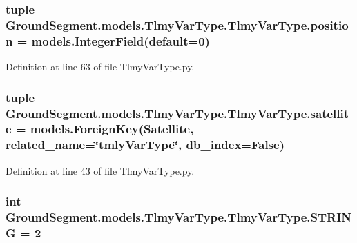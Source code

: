 \subsubsection[{position}]{\setlength{\rightskip}{0pt plus 5cm}tuple Ground\+Segment.\+models.\+Tlmy\+Var\+Type.\+Tlmy\+Var\+Type.\+position = models.\+Integer\+Field(default=0)\hspace{0.3cm}{\ttfamily [static]}}\label{class_ground_segment_1_1models_1_1_tlmy_var_type_1_1_tlmy_var_type_aa3a596ef393485c1f9574fbafc151967}


Definition at line 63 of file Tlmy\+Var\+Type.\+py.

\hypertarget{class_ground_segment_1_1models_1_1_tlmy_var_type_1_1_tlmy_var_type_a19f48547f2aaf1df7c8271723fad516e}{}
\subsubsection[{satellite}]{\setlength{\rightskip}{0pt plus 5cm}tuple Ground\+Segment.\+models.\+Tlmy\+Var\+Type.\+Tlmy\+Var\+Type.\+satellite = models.\+Foreign\+Key({\bf Satellite}, related\+\_\+name=\char`\"{}tmly\+Var\+Type\char`\"{}, db\+\_\+index=False)\hspace{0.3cm}{\ttfamily [static]}}\label{class_ground_segment_1_1models_1_1_tlmy_var_type_1_1_tlmy_var_type_a19f48547f2aaf1df7c8271723fad516e}


Definition at line 43 of file Tlmy\+Var\+Type.\+py.

\hypertarget{class_ground_segment_1_1models_1_1_tlmy_var_type_1_1_tlmy_var_type_afcb0a3433a7231e0f75a92c43ef2443a}{}
\subsubsection[{S\+T\+R\+I\+N\+G}]{\setlength{\rightskip}{0pt plus 5cm}int Ground\+Segment.\+models.\+Tlmy\+Var\+Type.\+Tlmy\+Var\+Type.\+S\+T\+R\+I\+N\+G = 2\hspace{0.3cm}{\ttfamily [static]}}\label{class_ground_segment_1_1models_1_1_tlmy_var_type_1_1_tlmy_var_type_afcb0a3433a7231e0f75a92c43ef2443a}


